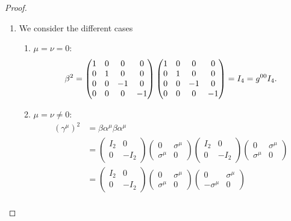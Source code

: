 \begin{proof}
\begin{enumerate}[label=(\alph*)]
	\item We consider the different cases
		\begin{enumerate}[label=(\arabic*)]
			\item $\mu=\nu=0$:
\[
	\beta^2 = \begin{pmatrix} 1 & 0 & 0 & 0\\
	0 & 1 & 0 & 0\\
0 & 0 & -1 & 0\\
0 & 0 & 0 & -1\end{pmatrix} \begin{pmatrix} 1 & 0 & 0 & 0\\
0 & 1 & 0 & 0\\
0 & 0 & -1 & 0\\
0 & 0 & 0 & -1\end{pmatrix} =I_4= g^{00}I_4 \\
.\] 
\item $\mu = \nu \neq 0$:
	\begin{align*}
		(\gamma^\mu)^2 &= \beta\alpha^\mu \beta\alpha^\mu\\
		       &= \begin{pmatrix} I_2 & 0 \\ 0 & -I_2 \end{pmatrix} \begin{pmatrix} 0 & \sigma^\mu \\ \sigma^\mu & 0 \end{pmatrix} \begin{pmatrix} I_2 & 0 \\ 0 & -I_2 \end{pmatrix} \begin{pmatrix} 0 & \sigma^\mu \\ \sigma^\mu & 0 \end{pmatrix}\\
		       &= \begin{pmatrix} I_2 & 0 \\ 0 & -I_2 \end{pmatrix} \begin{pmatrix} 0 & \sigma^\mu \\ \sigma^\mu & 0 \end{pmatrix} \begin{pmatrix} 0 & \sigma^\mu \\ -\sigma^\mu & 0 \end{pmatrix} \\

\end{align*}
\end{enumerate}
\end{enumerate}
\end{proof}

